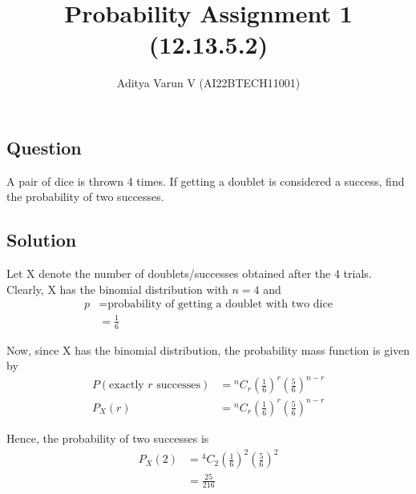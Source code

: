\documentclass[12pt,twocolumn,notitlepage]{article}
\title{Probability Assignment 1 (12.13.5.2)}
\author{Aditya Varun V (AI22BTECH11001)}
\date{}
\newcommand*{\comb}[2]{{}^{#1}C_{#2}}
\begin{document}
\maketitle
\subsection*{Question}
A pair of dice is thrown 4 times. If getting a doublet is considered a success, find
the probability of two successes.


\subsection*{Solution}

Let X denote the number of doublets/successes obtained after the 4 trials. Clearly, X has the binomial distribution with $n=4$ and
\begin{align}
    p &= \text{probability of getting a doublet with two dice} \nonumber \\
    &= \frac{1}{6} \nonumber
\end{align}

Now, since X has the binomial distribution, the probability mass function is given by
\begin{align}
    P(\text{exactly } r \text{ successes}) &= \comb{n}{r}\left(\frac{1}{6}\right)^{r}\left(\frac{5}{6}\right)^{n-r} \nonumber\\
    P_X(r) &= \comb{n}{r}\left(\frac{1}{6}\right)^{r}\left(\frac{5}{6}\right)^{n-r} \nonumber
\end{align}

Hence, the probability of two successes is
\begin{align}
    P_X(2) &= \comb{4}{2}\left(\frac{1}{6}\right)^{2}\left(\frac{5}{6}\right)^{2} \nonumber\\
    &= \frac{25}{216} \nonumber
\end{align}
\end{document}
